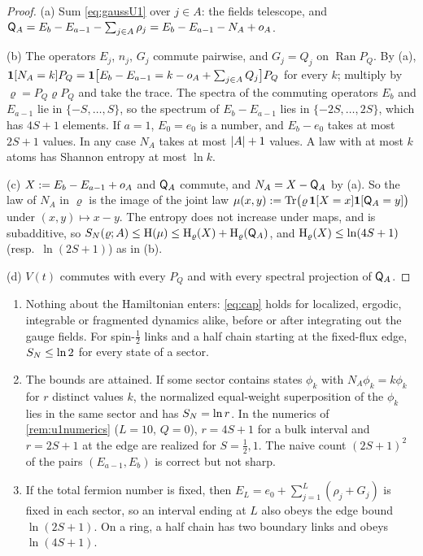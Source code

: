 \begin{proof}
(a) Sum \eqref{eq:gaussU1} over $j\in A$: the fields telescope, and
$\mathsf{Q}_A=E_b-E_{a-1}-\sum_{j\in A}\rho_j=E_b-E_{a-1}-N_A+o_A$.

(b) The operators $E_j$, $n_j$, $G_j$ commute pairwise, and $G_j=Q_j$ on $\operatorname{Ran}P_Q$.  By (a),
$\mathbf{1}[N_A=k]P_Q=\mathbf{1}\bigl[E_b-E_{a-1}=k-o_A+\sum_{j\in A}Q_j\bigr]P_Q$ for every $k$; multiply by $\varrho=P_Q\varrho P_Q$
and take the trace.  The spectra of the commuting operators $E_b$ and $E_{a-1}$ lie in $\{-S,\dots,S\}$, so the
spectrum of $E_b-E_{a-1}$ lies in $\{-2S,\dots,2S\}$, which has $4S+1$ elements.  If $a=1$, $E_0=e_0$ is a number,
and $E_b-e_0$ takes at most $2S+1$ values.  In any case $N_A$ takes at most $\left|A\right|+1$ values.  A law with at most
$k$ atoms has Shannon entropy at most $\ln k$.

(c) $X:=E_b-E_{a-1}+o_A$ and $\mathsf{Q}_A$ commute, and $N_A=X-\mathsf{Q}_A$ by (a).  So the law of $N_A$ in $\varrho$ is the image
of the joint law $\mu(x,y):=\operatorname{Tr}\bigl(\varrho\,\mathbf{1}[X=x]\mathbf{1}[\mathsf{Q}_A=y]\bigr)$ under $(x,y)\mapsto x-y$.  The entropy does not
increase under maps, and is subadditive, so $S_{N}(\varrho;A)\le\mathrm{H}(\mu)\le\mathrm{H}_\varrho(X)+\mathrm{H}_\varrho(\mathsf{Q}_A)$, and
$\mathrm{H}_\varrho(X)\le\ln(4S+1)$ (resp.\ $\ln(2S+1)$) as in (b).

(d) $V(t)$ commutes with every $P_Q$ and with every spectral projection of $\mathsf{Q}_A$.
\end{proof}

\begin{remark}\label{rem:gausscap}
\leavevmode
\begin{enumerate}[label=(\alph*)]
\item Nothing about the Hamiltonian enters: \eqref{eq:cap} holds for localized, ergodic, integrable or
fragmented dynamics alike, before or after integrating out the gauge fields.  For spin-$\frac12$ links and a
half chain starting at the fixed-flux edge, $S_{N}\le\ln2$ for every state of a sector.
\item The bounds are attained.  If some sector contains states $\phi_k$ with $N_A\phi_k=k\phi_k$ for $r$ distinct
values $k$, the normalized equal-weight superposition of the $\phi_k$ lies in the same sector and has
$S_{N}=\ln r$.  In the numerics of \cref{rem:u1numerics} ($L=10$, $Q=0$), $r=4S+1$ for a bulk interval and
$r=2S+1$ at the edge are realized for $S=\frac12,1$.  The naive count $(2S+1)^2$ of the pairs $(E_{a-1},E_b)$ is
correct but not sharp.
\item If the total fermion number is fixed, then $E_L=e_0+\sum_{j=1}^L(\rho_j+G_j)$ is fixed in each sector, so an
interval ending at $L$ also obeys the edge bound $\ln(2S+1)$.  On a ring, a half chain has two boundary links and
obeys $\ln(4S+1)$.
\end{enumerate}
\end{remark}


